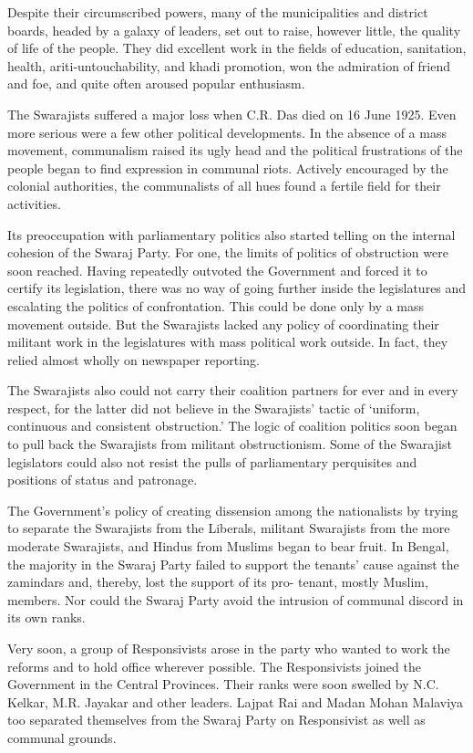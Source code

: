 \begin{multicols}{2}
Despite their circumscribed powers, many of the municipalities and district boards, headed by a galaxy of leaders, set out to raise, however little, the quality of life of the people. They did excellent work in the fields of education, sanitation, health, ariti-untouchability, and khadi promotion, won the admiration of friend and foe, and quite often aroused popular enthusiasm.

The Swarajists suffered a major loss when C.R. Das died on 16 June 1925. Even more serious were a few other political developments. In the absence of a mass movement, communalism raised its ugly head and the political frustrations of the people began to find expression in communal riots. Actively encouraged by the colonial authorities, the communalists of all hues found a fertile field for their activities.

Its preoccupation with parliamentary politics also started telling on the internal cohesion of the Swaraj Party. For one, the limits of politics of obstruction were soon reached. Having repeatedly outvoted the Government and forced it to certify its legislation, there was no way of going further inside the legislatures and escalating the politics of confrontation. This could be done only by a mass movement outside. But the Swarajists lacked any policy of coordinating their militant work in the legislatures with mass political work outside. In fact, they relied almost wholly on newspaper reporting.

The Swarajists also could not carry their coalition partners for ever and in every respect, for the latter did not believe in the Swarajists' tactic of `uniform, continuous and consistent obstruction.' The logic of coalition politics soon began to pull back the Swarajists from militant obstructionism. Some of the Swarajist legislators could also not resist the pulls of parliamentary perquisites and positions of status and patronage.

The Government's policy of creating dissension among the nationalists by trying to separate the Swarajists from the Liberals, militant Swarajists from the more moderate Swarajists, and Hindus from Muslims began to bear fruit. In Bengal, the majority in the Swaraj Party failed to support the tenants' cause against the zamindars and, thereby, lost the support of its pro- tenant, mostly Muslim, members. Nor could the Swaraj Party avoid the intrusion of communal discord in its own ranks.

Very soon, a group of Responsivists arose in the party who wanted to work the reforms and to hold office wherever possible. The Responsivists joined the Government in the Central Provinces. Their ranks were soon swelled by N.C. Kelkar, M.R. Jayakar and other leaders. Lajpat Rai and Madan Mohan Malaviya too separated themselves from the Swaraj Party on Responsivist as well as communal grounds.


\end{multicols}
